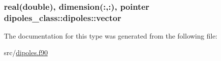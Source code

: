 \hypertarget{structdipoles__class_1_1dipoles_a658a483ea027a653fefdd02718773ea6}{
\subsubsection[{vector}]{\setlength{\rightskip}{0pt plus 5cm}real(double), dimension(\-:,\-:), pointer dipoles\-\_\-class\-::dipoles\-::vector\hspace{0.3cm}{\ttfamily [private]}}}\label{structdipoles__class_1_1dipoles_a658a483ea027a653fefdd02718773ea6}


The documentation for this type was generated from the following file\-:\begin{DoxyCompactItemize}
\item 
src/\hyperlink{dipoles_8f90}{dipoles.\-f90}\end{DoxyCompactItemize}
